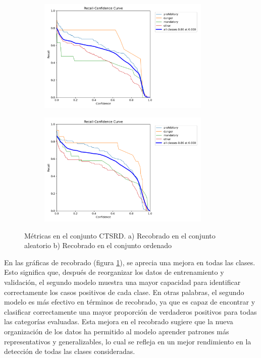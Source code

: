 \documentclass{article}
\begin{document}
\begin{figure}[h]
\begin{subfigure}[b]{0.5\textwidth}
\centering
\includegraphics[width=0.9\textwidth]{resources/random cuban R curve.png}
\caption{}
\end{subfigure}
\begin{subfigure}[b]{0.5\textwidth}
\centering
\includegraphics[width=0.9\textwidth]{resources/sim cuban R curve.png}
\caption{}
\end{subfigure}
\caption{Métricas en el conjunto CTSRD. a) Recobrado en el conjunto aleatorio b) Recobrado en el conjunto ordenado}
\label{fig:recall random vs recall sim}
\end{figure}

En las gráficas de recobrado (figura \ref{fig:recall random vs recall sim}), se aprecia una mejora en todas las clases. Esto significa que, después de reorganizar los datos de entrenamiento y validación, el segundo modelo muestra una mayor capacidad para identificar correctamente los casos positivos de cada clase. En otras palabras, el segundo modelo es más efectivo en términos de recobrado, ya que es capaz de encontrar y clasificar correctamente una mayor proporción de verdaderos positivos para todas las categorías evaluadas. Esta mejora en el recobrado sugiere que la nueva organización de los datos ha permitido al modelo aprender patrones más representativos y generalizables, lo cual se refleja en un mejor rendimiento en la detección de todas las clases consideradas.
\end{document}
